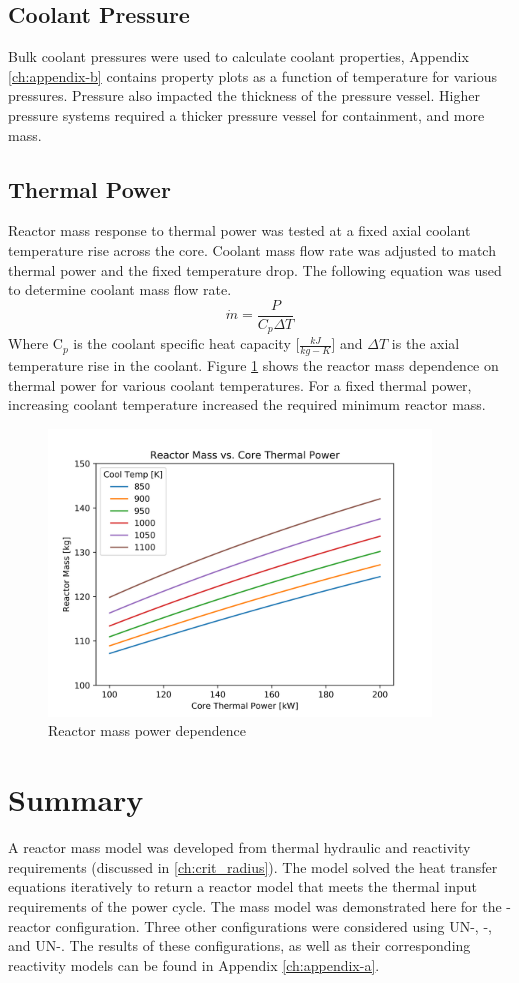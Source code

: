 \subsection{Coolant Pressure}
Bulk coolant pressures were used to calculate coolant properties, Appendix
\ref{ch:appendix-b} contains property plots as a function of temperature for
various pressures. Pressure also impacted the thickness of the pressure vessel.
Higher pressure systems required a thicker pressure vessel for containment, and more mass.

\subsection{Thermal Power}
Reactor mass response to thermal power was tested at a fixed axial coolant temperature
rise across the core. Coolant mass flow rate was adjusted to match thermal power
and the fixed temperature drop. The following equation was used to determine
coolant mass flow rate.
\begin{equation}
    \dot{m} = \frac{P}{C_p \Delta T}
\end{equation}
Where C$_p$ is the coolant specific heat capacity [$\frac{kJ}{kg-K}$] and
$\Delta T$ is the axial temperature rise in the coolant.
Figure \ref{fig:mass_vs_q_uo2_co2} shows the reactor mass dependence on thermal
power for various coolant temperatures. For a fixed thermal power, increasing
coolant temperature increased the required minimum reactor mass.

\begin{figure}[h]
    \centering
    \includegraphics[width=4in]{../images/mass_vs_q_uo2_co2.png}
\caption{Reactor mass power dependence}
\label{fig:mass_vs_q_uo2_co2}
\end{figure}

\section{Summary}
A reactor mass model was developed from thermal hydraulic and reactivity
requirements (discussed in \ref{ch:crit_radius}). The model solved the heat
transfer equations iteratively to return a reactor model that meets the thermal
input requirements of the power cycle. The mass model was demonstrated here for
the \uox-\codiox  reactor configuration. Three other configurations were
considered using UN-\codiox, \uox-\water, and UN-\water. The results of these
configurations, as well as their corresponding reactivity models can be found in
Appendix \ref{ch:appendix-a}.
